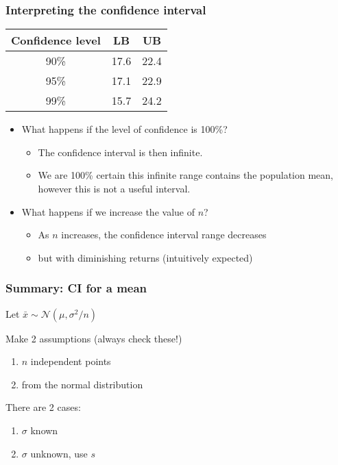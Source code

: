 \begin{frame}\frametitle{Interpreting the confidence interval}

	\begin{center}
		\begin{tabular}{c|cc}
			\textbf{Confidence level} & \textbf{LB} & \textbf{UB}\\ \hline
			90\%	& 17.6	&	22.4\\
			95\%	& 17.1	&	22.9\\
			99\%	& 15.7	&	24.2\\
		\end{tabular}
	\end{center}
	\begin{itemize}
		\item	What happens if the level of confidence is 100\%? 
		\begin{itemize}
			\item	The confidence interval is then infinite.
			\item	We are 100\% certain this infinite range contains the population mean, however this is not a useful interval.
		\end{itemize}
		\item	What happens if we increase the value of $n$? 
		\begin{itemize}
			\item	As $n$ increases, the confidence interval range decreases
			\item	but with diminishing returns (intuitively expected)
		\end{itemize}
	\end{itemize}
\end{frame}

\begin{frame}\frametitle{Summary: CI for a mean}

	Let $\bar{x} \sim \mathcal{N}(\mu, \sigma^2/n)$

	Make 2 assumptions (always check these!)
	\begin{enumerate}
		\item	$n$ independent points
		\item	from the normal distribution
	\end{enumerate}

	There are 2 cases:
	\begin{enumerate}
		\item	$\sigma$ known
		\item	$\sigma$ unknown, use $s$
	\end{enumerate}
\end{frame}

